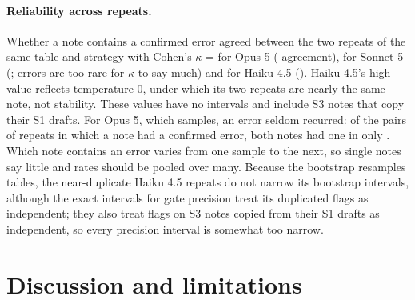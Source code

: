 \documentclass[11pt]{article}
\begin{document}
\paragraph{Reliability across repeats.} Whether a note contains a confirmed error agreed between the two repeats of the same table and strategy with Cohen's $\kappa$ = \KappaOpus{} for Opus 5 (\AgreeOpus{} agreement), \KappaSonnet{} for Sonnet 5 (\AgreeSonnet{}; errors are too rare for $\kappa$ to say much) and \KappaHaiku{} for Haiku 4.5 (\AgreeHaiku{}). Haiku 4.5's high value reflects temperature 0, under which its two repeats are nearly the same note, not stability. These values have no intervals and include S3 notes that copy their S1 drafts. For Opus 5, which samples, an error seldom recurred: of the \RecurAnyOpus{} pairs of repeats in which a note had a confirmed error, both notes had one in only \RecurBothOpus{}. Which note contains an error varies from one sample to the next, so single notes say little and rates should be pooled over many. Because the bootstrap resamples tables, the near-duplicate Haiku 4.5 repeats do not narrow its bootstrap intervals, although the exact intervals for gate precision treat its duplicated flags as independent; they also treat flags on S3 notes copied from their S1 drafts as independent, so every precision interval is somewhat too narrow.

\section{Discussion and limitations}
\label{sec:discussion}
\end{document}
